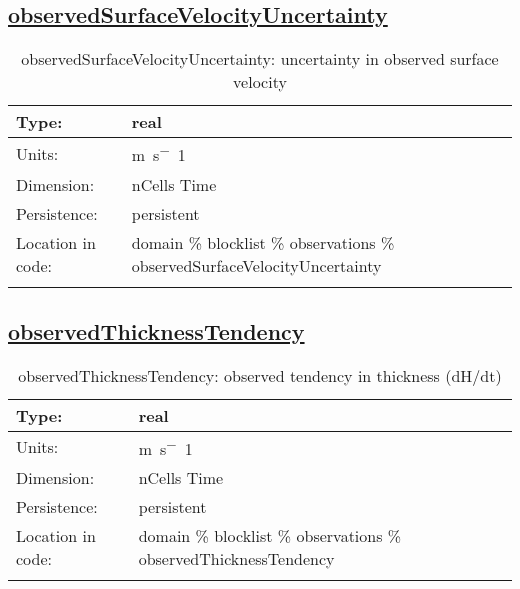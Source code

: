 \subsection[observedSurfaceVelocityUncertainty]{\hyperref[sec:var_tab_observations]{observedSurfaceVelocityUncertainty}}
\label{subsec:var_sec_observations_observedSurfaceVelocityUncertainty}
\begin{center}
\begin{longtable}{| p{2.0in} | p{4.0in} |}
        \hline 
        Type: & real \\
        \hline 
        Units: & \si{m.s^-1} \\
        \hline 
        Dimension: & nCells Time \\
        \hline 
        Persistence: & persistent \\
        \hline 
         Location in code: & domain \% blocklist \% observations \% observedSurfaceVelocityUncertainty \\
         \hline 
    \caption{observedSurfaceVelocityUncertainty: uncertainty in observed surface velocity}
\end{longtable}
\end{center}
\subsection[observedThicknessTendency]{\hyperref[sec:var_tab_observations]{observedThicknessTendency}}
\label{subsec:var_sec_observations_observedThicknessTendency}
\begin{center}
\begin{longtable}{| p{2.0in} | p{4.0in} |}
        \hline 
        Type: & real \\
        \hline 
        Units: & \si{m.s^-1} \\
        \hline 
        Dimension: & nCells Time \\
        \hline 
        Persistence: & persistent \\
        \hline 
         Location in code: & domain \% blocklist \% observations \% observedThicknessTendency \\
         \hline 
    \caption{observedThicknessTendency: observed tendency in thickness (dH/dt)}
\end{longtable}
\end{center}
